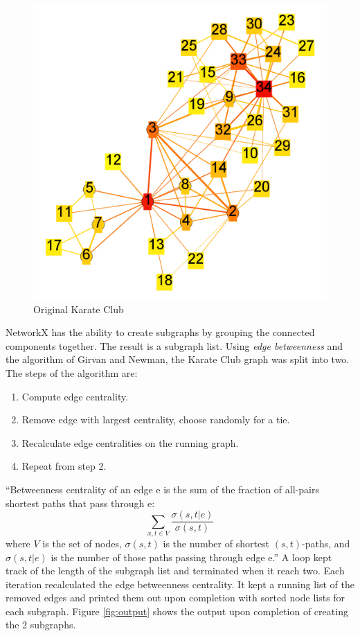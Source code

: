 \documentclass[paper=a4, fontsize=11pt]{scrartcl} %
\numberwithin{equation}{section} %
\numberwithin{figure}{section} %
\numberwithin{table}{section} %
\begin{document}
\begin{figure}[H]
\includegraphics[width=1\textwidth]{weighted/karateclub}
\caption{Original Karate Club}
\label{fig:karateclub}
\end{figure}

NetworkX has the ability to create subgraphs by grouping the connected components together.
The result is a subgraph list.\cite{bib:subgraph} 
Using \emph{edge  betweenness} and the algorithm of Girvan and Newman, the Karate Club graph was split into two.
The steps of the algorithm are:
\begin{enumerate}
\item Compute edge centrality.
\item Remove edge with largest centrality, choose randomly for a tie.
\item  Recalculate edge centralities on the running graph.
\item Repeat from step 2.\cite{bib:community}
\end{enumerate}

``Betweenness centrality of an edge e is the sum of the fraction of all-pairs shortest paths that pass through e:
\[ \sum_{x,t\in V} \frac{\sigma(s,t|e)} {\sigma(s,t)}\]
where \(V\) is the set of nodes, \(\sigma(s, t)\) is the number of shortest \((s, t)\)-paths, and \(\sigma(s, t|e)\) is the number of those paths passing through edge e.''\cite{bib:edge-btn}
A loop kept track of the length of the subgraph list and terminated when it reach two.
Each iteration recalculated the edge betweenness centrality.
It kept a running list of the removed edges and printed them out upon completion with sorted node lists for each subgraph.
Figure \ref{fig:output} shows the output upon completion of creating the 2 subgraphs.
\end{document}
